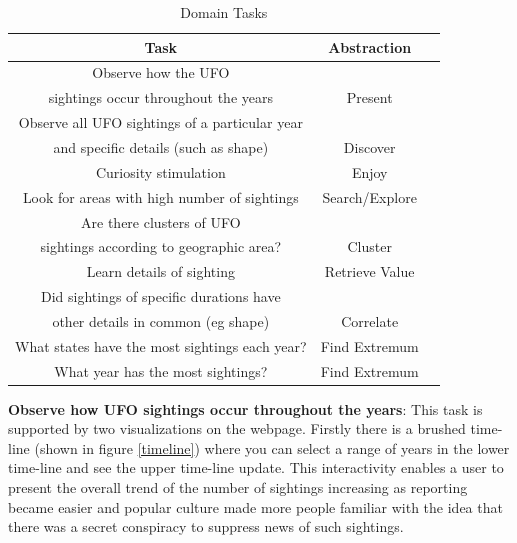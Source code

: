 \documentclass[journal]{vgtc}                %
\begin{document}
\begin{table}[h]
\caption{Domain Tasks} %
\centering %
\begin{tabular}{c c c} %
\hline\hline %
 Task & Abstraction\\ [0.5ex]
\hline %

Observe how the UFO \\sightings occur throughout the years & Present\\[1ex] %

Observe all UFO sightings of a particular year \\ and specific details (such as shape) & Discover\\[1ex] %

Curiosity stimulation & Enjoy\\[1ex] %

Look for areas with high number of sightings & Search/Explore\\[1ex] %

Are there clusters of UFO\\ sightings according to geographic area? & Cluster\\[1ex] %

Learn details of sighting & Retrieve Value\\[1ex] %

Did sightings of specific durations have \\ other details in common (eg shape) & Correlate \\[1ex] %

What states have the most sightings each year? & Find Extremum\\[1ex] %

What year has the most sightings? & Find Extremum\\[1ex] %


\hline 
\end{tabular}
\label{tab:PPer}
\end{table}

\textbf{Observe how UFO sightings occur throughout the years}: This task is supported by two visualizations on the webpage. Firstly there is a brushed time-line (shown in figure \ref{timeline}) where you can select a range of years in the lower time-line and see the upper time-line update. This interactivity enables a user to present the overall trend of the number of sightings increasing as reporting became easier and popular culture made more people familiar with the idea that there was a secret conspiracy to suppress news of such sightings.
\end{document}
